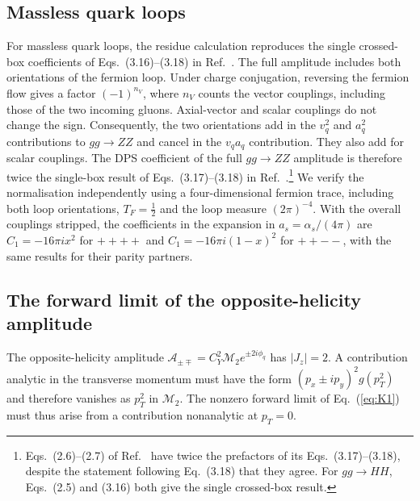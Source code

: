 \documentclass[%
 onecolumn,
 superscriptaddress,
 preprintnumbers,
 nofootinbib,
 amsmath,amssymb,
 aps,
 prl,
]{revtex4-2}
\newcommand{\M}{\mathcal M}
\newcommand{\hel}[4]{{#1}{#2}{#3}{#4}}
\begin{document}
\subsection{Massless quark loops}
\label{sec:quarkloops}

For massless quark loops, the residue calculation
reproduces the single crossed-box coefficients of
Eqs.~(3.16)--(3.18) in Ref.~\cite{Gaunt:2011xd}.
The full amplitude includes both orientations of the
fermion loop. Under charge conjugation, reversing the
fermion flow gives a factor $(-1)^{n_V}$, where $n_V$
counts the vector couplings, including those of the
two incoming gluons. Axial-vector and scalar
couplings do not change the sign.
Consequently, the two orientations add in the
$v_q^2$ and $a_q^2$ contributions to $gg\to ZZ$
and cancel in the $v_qa_q$ contribution. They
also add for scalar couplings.
%
The DPS coefficient of the full $gg\to ZZ$
amplitude is therefore twice the single-box
result of Eqs.~(3.17)--(3.18) in
Ref.~\cite{Gaunt:2011xd}.\footnote{
Eqs.~(2.6)--(2.7) of Ref.~\cite{Gaunt:2011xd}
have twice the prefactors of its
Eqs.~(3.17)--(3.18), despite the statement
following Eq.~(3.18) that they agree.
For $gg\to HH$, Eqs.~(2.5) and (3.16)
both give the single crossed-box result.}
We verify the normalisation independently using
a four-dimensional fermion trace, including
both loop orientations, $T_F=\frac12$ and
the loop measure $(2\pi)^{-4}$.
With the overall couplings stripped, the
coefficients in the expansion in
$a_s=\alpha_s/(4\pi)$ are
$C_1=-16\pi ix^2$ for $\hel++++$ and
$C_1=-16\pi i(1-x)^2$ for $\hel++--$,
with the same results for their parity partners.


\subsection{The forward limit of the opposite-helicity amplitude}
\label{sec:K1complete}

The opposite-helicity amplitude
$\mathcal A_{\pm\mp}=C_Y^2\M_2e^{\pm2i\phi_q}$
has $|J_z|=2$. A contribution analytic in
the transverse momentum must have the form
$(p_x\pm ip_y)^2g(p_T^2)$ and therefore
vanishes as $p_T^2$ in $\M_2$.
The nonzero forward limit of Eq.~(\ref{eq:K1})
must thus arise from a contribution nonanalytic
at $p_T=0$.
\end{document}
